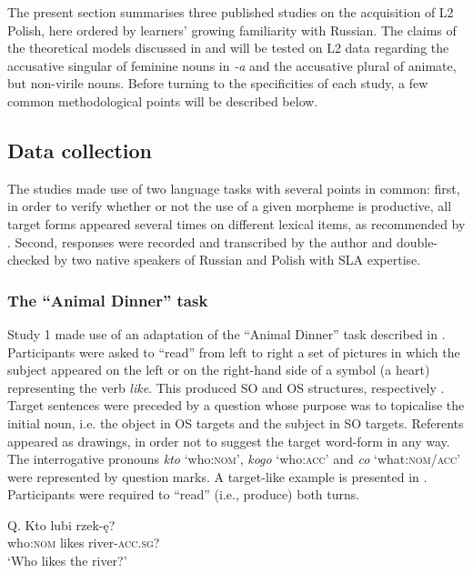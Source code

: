 \documentclass[output=paper,            colorlinks, citecolor=brown            		  ]{langscibook}
\begin{document}
The present section summarises three published studies on the acquisition of L2 Polish, here ordered by learners’ growing familiarity with Russian. The claims of the theoretical models discussed in  and  will be tested on L2 data regarding the accusative singular of feminine nouns in \textit{{}-a} and the accusative plural of animate, but non-virile nouns. Before turning to the specificities of each study, a few common methodological points will be described below. 

\subsection{Data collection} %
\label{sec:saturno:3.1}

The studies made use of two language tasks with several points in common: first, in order to verify whether or not the use of a given morpheme is productive, all target forms appeared several times on different lexical items, as recommended by \citet{Pallotti2007}. Second, responses were recorded and transcribed by the author and double-checked by two native speakers of Russian and Polish with SLA expertise. 

\subsubsection{The “Animal Dinner” task}\label{sec:saturno:3.1.1}
Study 1 made use of an adaptation of the “Animal Dinner” task described in \citet{DiBiase2007}. Participants were asked to “read” from left to right a set of pictures in which the subject appeared on the left or on the right-hand side of a symbol (a heart) representing the verb \textit{like}. This produced SO and OS structures, respectively . Target sentences were preceded by a question whose purpose was to topicalise the initial noun, i.e. the object in OS targets and the subject in SO targets. Referents appeared as drawings, in order not to suggest the target word-form in any way. The interrogative pronouns \textit{kto} ‘who:\textsc{nom}’, \textit{kogo} ‘who:\textsc{acc}’ and \textit{co} ‘what:\textsc{nom/acc}’ were represented by question marks. A target-like example is presented in . Participants were required to “read” (i.e., produce) both turns.

\ea\label{ex:saturno:17}  
\gll Q.  Kto    lubi  rzek-ę?\\
    {} who:\textsc{nom}  likes  river-\textsc{acc.sg}?\\
\glt \hspace{2.5ex}‘Who likes the river?’
\end{document}
